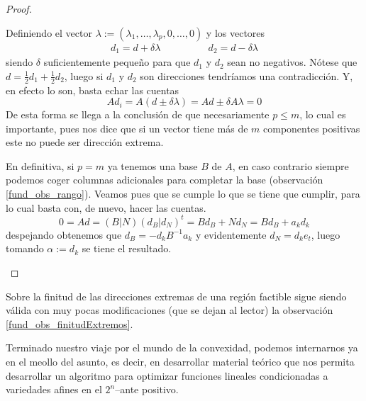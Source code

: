 \begin{proof}
\begin{itemize}
		Definiendo el vector $\lambda:=(\lambda_1,\dots,\lambda_p,0,\dots,0)$ y los vectores
		\begin{equation*}
			\begin{array}{cc}
			d_1=d+\delta\lambda\qquad&\qquad d_2=d-\delta\lambda
			\end{array}
		\end{equation*} siendo $\delta$ suficientemente pequeño para que $d_1$ y $d_2$ sean no negativos. Nótese que $d=\frac{1}{2}d_1+\frac{1}{2}d_2$, luego si $d_1$ y $d_2$ son direcciones tendríamos una contradicción. Y, en efecto lo son, basta echar las cuentas
		\begin{equation*}
			Ad_i=A(d\pm\delta\lambda)=Ad\pm\delta A\lambda=0
		\end{equation*}
		De esta forma se llega a la conclusión de que necesariamente $p\leq m$, lo cual es importante, pues nos dice que si un vector tiene más de $m$ componentes positivas este no puede ser dirección extrema.
		
		En definitiva, si $p=m$ ya tenemos una base $B$ de $A$, en caso contrario siempre podemos coger columnas adicionales para completar la base (observación \ref{fund_obs_rango}). Veamos pues que se cumple lo que se tiene que cumplir, para lo cual basta con, de nuevo, hacer las cuentas.
		\begin{equation*}
			0=Ad=(B|N)(d_B|d_N)^t=Bd_B+Nd_N=Bd_B+a_kd_k
		\end{equation*}
		despejando obtenemos que $d_B=-d_kB^{-1}a_k$ y evidentemente $d_N=d_ke_t$, luego tomando $\alpha:=d_k$ se tiene el resultado.\qedhere
	\end{itemize}
\end{proof}
\begin{obs}[Finitud]
	Sobre la finitud de las direcciones extremas de una región factible sigue siendo válida con muy pocas modificaciones (que se dejan al lector) la observación \ref{fund_obs_finitudExtremos}.
\end{obs}
Terminado nuestro viaje por el mundo de la convexidad, podemos internarnos ya en el meollo del asunto, es decir, en desarrollar material teórico que nos permita desarrollar un algoritmo para optimizar funciones lineales condicionadas a variedades afines en el $2^n$--ante positivo.
